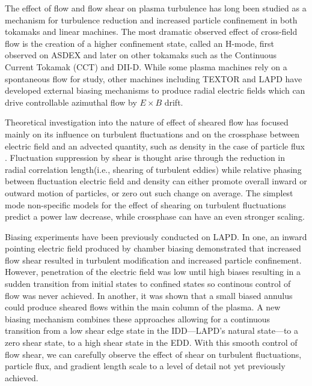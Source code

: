 \documentclass[%
 aps,
 prl,
 amsmath,amssymb,
 reprint,%
]{revtex4-1}
\begin{document}
\maketitle


The effect of flow and flow shear on plasma turbulence has long been studied as a mechanism for turbulence reduction and increased particle confinement in both tokamaks and linear machines.  The most dramatic observed effect of cross-field flow is the creation of a higher confinement state, called an H-mode, first observed on ASDEX\cite{wagner82} and later on other tokamaks such as the Continuous Current Tokamak (CCT)\cite{taylor89,tynan92} and DII-D\cite{groebner90,moyer95}. While some plasma machines rely on a spontaneous flow for study\cite{tynan06}, other machines including TEXTOR\cite{boedo00} and LAPD\cite{maggs07,carter09} have developed external biasing mechanisms to produce radial electric fields which can drive controllable azimuthal flow by $E \times B$ drift\cite{weynants93}.

Theoretical investigation into the nature of effect of sheared flow has focused mainly on its influence on turbulent fluctuations \cite{biglari90} and on the crossphase between electric field and an advected quantity, such as density in the case of particle flux \cite{ware96,terry01}. Fluctuation suppression by shear is thought arise through the reduction in radial correlation length(i.e., shearing of turbulent eddies) while relative phasing between fluctuation electric field and density can either promote overall inward or outward motion of particles, or zero out such change on average. The simplest mode non-specific models for the effect of shearing on turbulent fluctuations predict a power law decrease\cite{biglari90}, while crossphase can have an even stronger scaling\cite{terry01}.

Biasing experiments have been previously conducted on LAPD. In one, an inward pointing electric field produced by chamber biasing demonstrated that increased flow shear resulted in turbulent modification and increased particle confinement\cite{carter09}. However, penetration of the electric field was low until high biases resulting in a sudden transition from initial states to confined states so continous control of flow was never achieved. In another, it was shown that a small biased annulus could produce sheared flows within the main column of the plasma\cite{zhou12}. A new biasing mechanism combines these approaches allowing for a continuous transition from a low shear edge state in the IDD---LAPD's natural state---to a zero shear state, to a high shear state in the EDD. With this smooth control of flow shear, we can carefully observe the effect of shear on turbulent fluctuations, particle flux, and gradient length scale to a level of detail not yet previously achieved.
\end{document}
